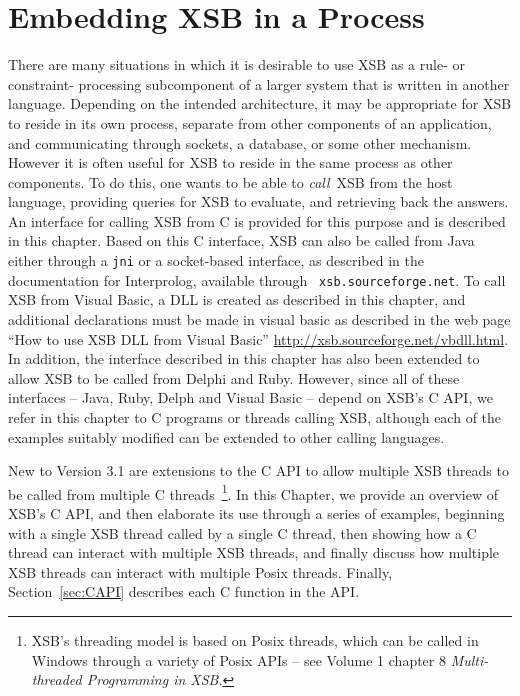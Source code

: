 \chapter{Embedding XSB in a Process}
\label{ccallingxsb}

There are many situations in which it is desirable to use XSB as a
rule- or constraint- processing subcomponent of a larger system that
is written in another language.  Depending on the intended
architecture, it may be appropriate for XSB to reside in its own
process, separate from other components of an application, and
communicating through sockets, a database, or some other mechanism.
However it is often useful for XSB to reside in the same process as
other components.  To do this, one wants to be able to {\em call}\ XSB
from the host language, providing queries for XSB to evaluate, and
retrieving back the answers.  An interface for calling XSB from C is
provided for this purpose and is described in this chapter.  Based on
this C interface, XSB can also be called from Java either through a
{\tt jni} or a socket-based interface, as described in the
documentation for Interprolog, available through {\tt
  xsb.sourceforge.net}.  To call XSB from Visual Basic, a DLL is
created as described in this chapter, and additional declarations must
be made in visual basic as described in the web page ``How to use XSB
DLL from Visual Basic'' \url{http://xsb.sourceforge.net/vbdll.html}.
In addition, the interface described in this chapter has also been
extended to allow XSB to be called from Delphi and Ruby.  However,
since all of these interfaces -- Java, Ruby, Delph and Visual Basic --
depend on XSB's C API, we refer in this chapter to C programs or
threads calling XSB, although each of the examples suitably modified
can be extended to other calling languages.

New to Version 3.1 are extensions to the C API to allow multiple XSB
threads to be called from multiple C threads~\footnote{XSB's threading
  model is based on Posix threads, which can be called in Windows
  through a variety of Posix APIs -- see Volume 1 chapter 8 {\em
    Multi-threaded Programming in XSB}.}.  In this Chapter, we provide
an overview of XSB's C API, and then elaborate its use through a
series of examples, beginning with a single XSB thread called by a
single C thread, then showing how a C thread can interact with
multiple XSB threads, and finally discuss how multiple XSB threads can
interact with multiple Posix threads.  Finally, Section~\ref{sec:CAPI}
describes each C function in the API.

